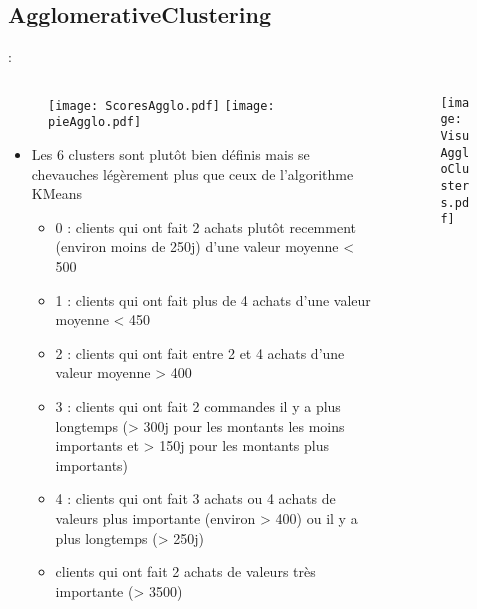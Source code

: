 \documentclass[8pt,aspectratio=169,hyperref={unicode=true}]{beamer}
\begin{document}
\subsection{AgglomerativeClustering}
\begin{frame}{\insertsection: \insertsubsection}
    \begin{columns}
        \begin{column}{.55\textwidth}
            \begin{figure}
                \texttt{[image: ScoresAgglo.pdf]}
                \texttt{[image: pieAgglo.pdf]}
            \end{figure}
            \begin{itemize}
                \footnotesize
                \item Les 6 clusters sont plutôt bien définis mais se chevauches légèrement plus que ceux de l'algorithme KMeans
                      \begin{itemize}
                          \scriptsize
                          \item 0 : clients qui ont fait 2 achats plutôt recemment (environ moins de 250j) d'une valeur moyenne < 500
                          \item 1 : clients qui ont fait plus de 4 achats d'une valeur moyenne < 450
                          \item 2 : clients qui ont fait entre 2 et 4 achats d'une valeur moyenne > 400
                          \item 3 : clients qui ont fait 2 commandes il y a plus longtemps (> 300j pour les montants les moins importants et > 150j pour les montants plus importants)
                          \item 4 : clients qui ont fait 3 achats ou 4 achats de valeurs plus importante (environ > 400) ou il y a plus longtemps (> 250j)
                          \item clients qui ont fait 2 achats de valeurs très importante (> 3500)
                      \end{itemize}
            \end{itemize}
        \end{column}
        \begin{column}{.45\textwidth}
            \begin{figure}
                \texttt{[image: VisuAggloClusters.pdf]}
            \end{figure}
        \end{column}
    \end{columns}
\end{frame}
\end{document}
